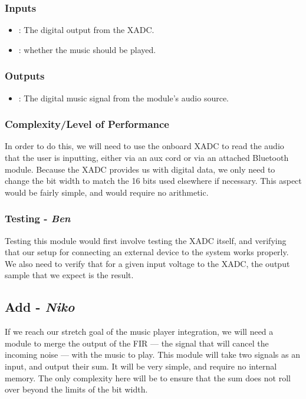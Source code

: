 \documentclass{fpgairpods}
\begin{document}
\begin{multicols*}{2}
\subsubsection{Inputs}
\begin{itemize}
    \item {}: The digital output from the XADC.
    \item {}: whether the music should be played.
\end{itemize}
\subsubsection{Outputs}
\begin{itemize}
    \item {}: The digital music signal from the module's audio source. 
\end{itemize}
\subsubsection{Complexity/Level of Performance}
In order to do this, we will need to use the onboard XADC to read the audio that the user is inputting, either via an aux cord or via an attached Bluetooth module. Because the XADC provides us with digital data, we only need to change the bit width to match the 16 bits used elsewhere if necessary. This aspect would be fairly simple, and would require no arithmetic. 
\subsubsection{Testing - \textit{Ben}}
Testing this module would first involve testing the XADC itself, and verifying that our setup for connecting an external device to the system works properly. We also need to verify that for a given input voltage to the XADC, the output sample that we expect is the result.

\subsection{Add - \textit{Niko}}
If we reach our stretch goal of the music player integration, we will need a module to merge the output of the FIR --- the signal that will cancel the incoming noise --- with the music to play. This module will take two signals as an input, and output their sum. It will be very simple, and require no internal memory. The only complexity here will be to ensure that the sum does not roll over beyond the limits of the bit width.

\end{multicols*}
\end{document}
